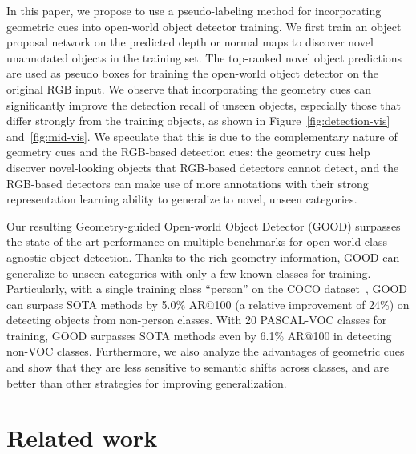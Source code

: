 \documentclass{article} \usepackage{iclr2023_conference,times}
\begin{document}
In this paper, we propose to use a pseudo-labeling method for incorporating geometric cues into open-world object detector training.
We first train an object proposal network on the predicted depth or normal maps to discover novel unannotated objects in the training set. The top-ranked novel object predictions are used as pseudo boxes for training the open-world object detector on the original RGB input. We observe that incorporating the geometry cues can significantly improve the detection recall of unseen objects, especially those that differ strongly from the training objects, as shown in Figure~\ref{fig:detection-vis} and~\ref{fig:mid-vis}.
We speculate that this is due to the complementary nature of geometry cues and the RGB-based detection cues: the geometry cues help discover novel-looking objects that RGB-based detectors cannot detect, and the RGB-based detectors can make use of more annotations with their strong representation learning ability to generalize to novel, unseen categories.

Our resulting Geometry-guided Open-world Object Detector (GOOD) surpasses the state-of-the-art performance on multiple benchmarks for open-world class-agnostic object detection.
Thanks to the rich geometry information, GOOD can generalize to unseen categories with only a few known classes for training.
Particularly, with a single training class ``person'' on the COCO dataset~\citep{CoCodataset}, GOOD can surpass SOTA methods by 5.0\% AR@100 (a relative improvement of 24\%) on detecting objects from non-person classes. With 20 PASCAL-VOC classes for training, GOOD surpasses SOTA methods even by 6.1\% AR@100 in detecting non-VOC classes.
Furthermore, we also analyze the advantages of geometric cues and show that they are less sensitive to semantic shifts across classes, and are better than other strategies for improving generalization.


 \section{Related work}
\end{document}
